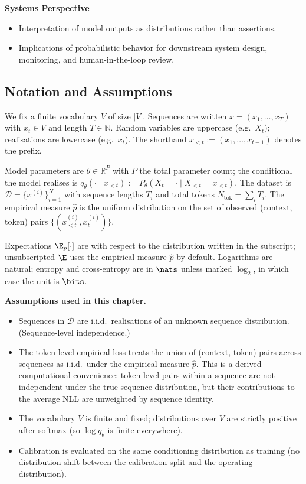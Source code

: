 \textbf{Systems Perspective}
\begin{itemize}
  \item Interpretation of model outputs as distributions rather than assertions.
  \item Implications of probabilistic behavior for downstream system design, monitoring, and human-in-the-loop review.
\end{itemize}

\subsection{Notation and Assumptions}
\label{sec:week1_notation}

\begin{notationbox}
We fix a finite vocabulary $V$ of size $|V|$. Sequences are written
$x = (x_1, \dots, x_T)$ with $x_t \in V$ and length $T \in \mathbb{N}$.
Random variables are uppercase (e.g.\ $X_t$); realisations are lowercase
(e.g.\ $x_t$). The shorthand $x_{<t} := (x_1, \dots, x_{t-1})$ denotes
the prefix.

Model parameters are $\theta \in \mathbb{R}^P$ with $P$ the total
parameter count; the conditional the model realises is $q_\theta(\cdot
\mid x_{<t}) := P_\theta(X_t = \cdot \mid X_{<t} = x_{<t})$. The dataset
is $\mathcal{D} = \{x^{(i)}\}_{i=1}^{N}$ with sequence lengths $T_i$ and
total tokens $N_{\mathrm{tok}} = \sum_i T_i$. The empirical measure
$\hat{p}$ is the uniform distribution on the set of observed
(context, token) pairs $\{(x^{(i)}_{<t}, x^{(i)}_t)\}$.

Expectations $\E_p[\cdot]$ are with respect to the distribution written
in the subscript; unsubscripted $\E$ uses the empirical measure
$\hat{p}$ by default. Logarithms are natural; entropy and cross-entropy
are in $\nats$ unless marked $\log_2$, in which case the unit is
$\bits$.

\textbf{Assumptions used in this chapter.}
\begin{itemize}
  \item[A1.1a] Sequences in $\mathcal{D}$ are i.i.d.\ realisations of an
  unknown sequence distribution. (Sequence-level independence.)
  \item[A1.1b] The token-level empirical loss treats the union of
  (context, token) pairs across sequences as i.i.d.\ under the
  empirical measure $\hat{p}$. This is a derived computational
  convenience: token-level pairs within a sequence are not
  independent under the true sequence distribution, but their
  contributions to the average NLL are unweighted by sequence
  identity.
  \item[A1.2] The vocabulary $V$ is finite and fixed; distributions over
  $V$ are strictly positive after softmax (so $\log q_\theta$ is finite
  everywhere).
  \item[A1.3] Calibration is evaluated on the same conditioning
  distribution as training (no distribution shift between the calibration
  split and the operating distribution).
\end{itemize}
\end{notationbox}

